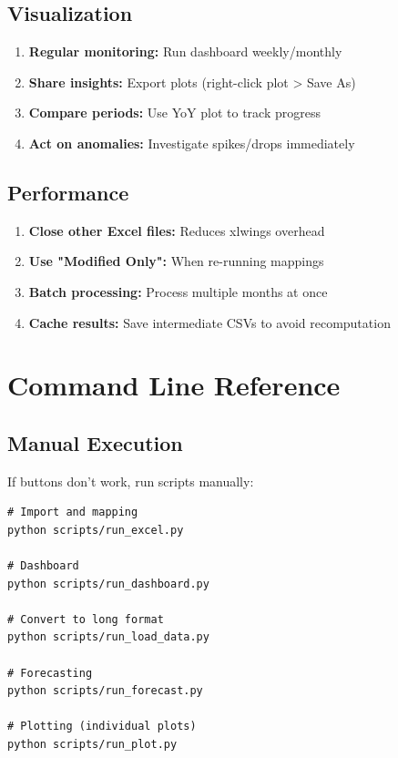\subsection{Visualization}

\begin{enumerate}
    \item \textbf{Regular monitoring:} Run dashboard weekly/monthly
    \item \textbf{Share insights:} Export plots (right-click plot > Save As)
    \item \textbf{Compare periods:} Use YoY plot to track progress
    \item \textbf{Act on anomalies:} Investigate spikes/drops immediately
\end{enumerate}

\subsection{Performance}

\begin{enumerate}
    \item \textbf{Close other Excel files:} Reduces xlwings overhead
    \item \textbf{Use "Modified Only":} When re-running mappings
    \item \textbf{Batch processing:} Process multiple months at once
    \item \textbf{Cache results:} Save intermediate CSVs to avoid recomputation
\end{enumerate}

\section{Command Line Reference}

\subsection{Manual Execution}

If buttons don't work, run scripts manually:

\begin{lstlisting}
# Import and mapping
python scripts/run_excel.py

# Dashboard
python scripts/run_dashboard.py

# Convert to long format
python scripts/run_load_data.py

# Forecasting
python scripts/run_forecast.py

# Plotting (individual plots)
python scripts/run_plot.py
\end{lstlisting}

